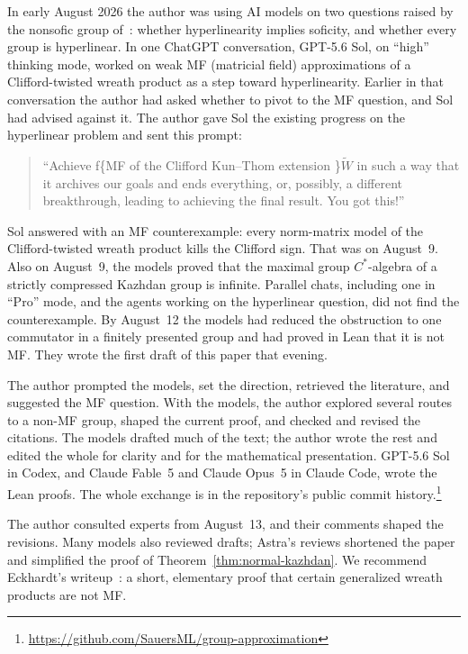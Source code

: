 \documentclass[11pt]{amsart}
\theoremstyle{plain}
\begin{document}
In early August 2026 the author was using AI models on two questions
raised by the nonsofic group of~\cite{OAI}: whether hyperlinearity
implies soficity, and whether every group is hyperlinear.  In one ChatGPT conversation, GPT-5.6 Sol, on ``high''
thinking mode, worked on weak MF (matricial field) approximations of a
Clifford-twisted wreath product as a step toward hyperlinearity.  Earlier in that
conversation the author had asked whether to pivot to the MF question,
and Sol had advised against it.  The author gave Sol the existing
progress on the hyperlinear problem and sent this prompt:
\begin{quote}
``Achieve f\{MF of the Clifford Kun--Thom extension \}$\widetilde W$
in such a way that it archives our goals and ends everything, or,
possibly, a different breakthrough, leading to achieving the final
result.  You got this!''
\end{quote}
Sol answered with an MF counterexample: every norm-matrix model of the
Clifford-twisted wreath product kills the Clifford sign.  That was on
August~9.  Also on August~9, the models proved that the maximal group
$C^*$-algebra of a strictly compressed Kazhdan group is infinite.
Parallel chats, including one in ``Pro'' mode, and the agents working
on the hyperlinear question, did not find the counterexample.  By
August~12 the models had reduced the obstruction to one commutator in
a finitely presented group and had proved in Lean that it is not MF\@.  They wrote the
first draft of this paper that evening.

The author prompted the models, set the direction, retrieved the
literature, and suggested the MF question.  With the models, the
author explored several routes to a non-MF group, shaped the current
proof, and checked and revised the citations.  The models drafted much of the text;
the author wrote the rest and edited the whole for clarity and for the
mathematical presentation.  GPT-5.6 Sol in Codex, and Claude
Fable~5 and Claude Opus~5 in Claude Code, wrote the Lean proofs.  The
whole exchange is in the repository's public commit
history.\footnote{\url{https://github.com/SauersML/group-approximation}}

The author consulted experts from August~13, and their comments shaped
the revisions.  Many models also reviewed drafts; Astra's reviews
shortened the paper and simplified the proof of
Theorem~\ref{thm:normal-kazhdan}.  We recommend Eckhardt's
writeup~\cite{Eckhardt}: a short, elementary proof that certain
generalized wreath products are not MF\@.
\end{document}
